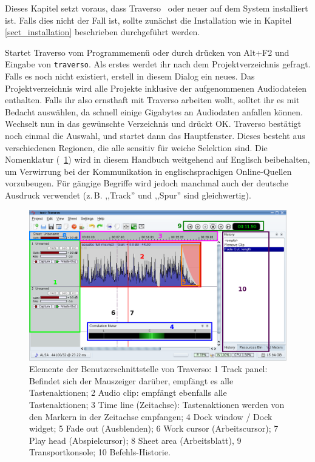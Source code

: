 Dieses Kapitel setzt voraus, dass Traverso \Version\ oder neuer auf dem System installiert ist. Falls dies nicht der Fall ist, sollte zunächst die Installation wie in Kapitel \ref{sect_installation} beschrieben durchgeführt werden.

Startet Traverso vom Programmemenü oder durch drücken von Alt+F2 und Eingabe von \texttt{traverso}. Als erstes werdet ihr nach dem Projektverzeichnis gefragt. Falls es noch nicht existiert, erstell in diesem Dialog ein neues. Das Projektverzeichnis wird alle Projekte inklusive der aufgenommenen Audiodateien enthalten. Falls ihr also ernsthaft mit Traverso arbeiten wollt, solltet ihr es mit Bedacht auswählen, da schnell einige Gigabytes an Audiodaten anfallen können. Wechselt nun in das gewünschte Verzeichnis und drückt OK. Traverso bestätigt noch einmal die Auswahl, und startet dann das Hauptfenster. Dieses besteht aus verschiedenen Regionen, die alle sensitiv für weiche Selektion sind. Die Nomenklatur (\FigB\ \ref{fig_gui01}) wird in diesem Handbuch weitgehend auf Englisch beibehalten, um Verwirrung bei der Kommunikation in englischsprachigen Online-Quellen vorzubeugen. Für gängige Begriffe wird jedoch manchmal auch der deutsche Ausdruck verwendet (z.\,B. ,,Track'' und ,,Spur'' sind gleichwertig).

\begin{figure}
 \centering\includegraphics[width=\textwidth]{../images/sshot06.png}
 \caption{Elemente der Benutzerschnittstelle von Traverso: 1 Track panel: Befindet sich der Mauszeiger darüber, empfängt es alle Tastenaktionen; 2 Audio clip: empfängt ebenfalls alle Tastenaktionen; 3 Time line (Zeitachse): Tastenaktionen werden von den Markern in der Zeitachse empfangen; 4 Dock window / Dock widget; 5 Fade out (Ausblenden); 6 Work cursor (Arbeitscursor); 7 Play head (Abspielcursor); 8 Sheet area (Arbeitsblatt), 9 Transportkonsole; 10 Befehls-Historie.}
 \label{fig_gui01}
\end{figure}

